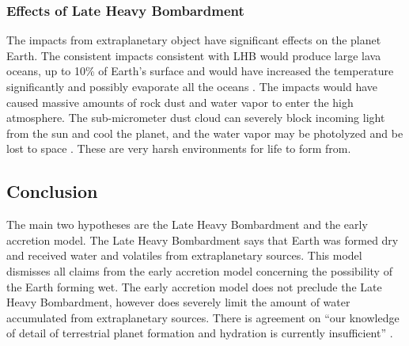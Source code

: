 \subsubsection{Effects of Late Heavy Bombardment}
The impacts from extraplanetary object have significant effects on the planet Earth.
The consistent impacts consistent with LHB would produce large lava oceans, up to 10\% of Earth's surface  and would have increased the temperature significantly and possibly evaporate all the oceans \cite{LavaOcean}.
The impacts would have caused massive amounts of rock dust and water vapor to enter the high atmosphere. The sub-micrometer dust cloud can severely block incoming light from the sun and cool the planet, and the water vapor may be photolyzed and be lost to space \cite{ImpactDust}. 
These are very harsh environments for life to form from.


\subsection{Conclusion}
The main two hypotheses are the Late Heavy Bombardment and the early accretion model. The Late Heavy Bombardment says that Earth was formed dry and received water and volatiles from extraplanetary sources. This model dismisses all claims from the early accretion model concerning the possibility of the Earth forming wet. The early accretion model does not preclude the Late Heavy Bombardment, however does severely limit the amount of water accumulated from extraplanetary sources. There is agreement on “our knowledge of detail of terrestrial planet formation and hydration is currently insufficient” \cite{BOMB14}.




